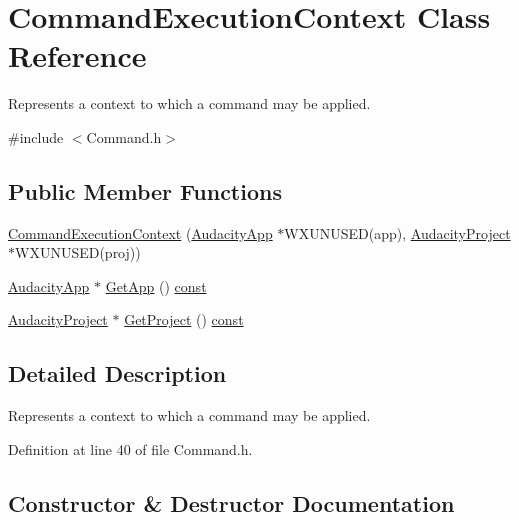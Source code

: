 \hypertarget{class_command_execution_context}{}\section{Command\+Execution\+Context Class Reference}
\label{class_command_execution_context}


Represents a context to which a command may be applied.  




{\ttfamily \#include $<$Command.\+h$>$}

\subsection*{Public Member Functions}
\begin{DoxyCompactItemize}
\item 
\hyperlink{class_command_execution_context_a73c8a226f406c1b197dfd97530d6c306}{Command\+Execution\+Context} (\hyperlink{class_audacity_app}{Audacity\+App} $\ast$W\+X\+U\+N\+U\+S\+ED(app), \hyperlink{class_audacity_project}{Audacity\+Project} $\ast$W\+X\+U\+N\+U\+S\+ED(proj))
\item 
\hyperlink{class_audacity_app}{Audacity\+App} $\ast$ \hyperlink{class_command_execution_context_a10676d61a2e19f1fc5608151f57827b2}{Get\+App} () \hyperlink{getopt1_8c_a2c212835823e3c54a8ab6d95c652660e}{const} 
\item 
\hyperlink{class_audacity_project}{Audacity\+Project} $\ast$ \hyperlink{class_command_execution_context_ab4f1b74de73ee90f760c71ff9f818b96}{Get\+Project} () \hyperlink{getopt1_8c_a2c212835823e3c54a8ab6d95c652660e}{const} 
\end{DoxyCompactItemize}


\subsection{Detailed Description}
Represents a context to which a command may be applied. 

Definition at line 40 of file Command.\+h.



\subsection{Constructor \& Destructor Documentation}
